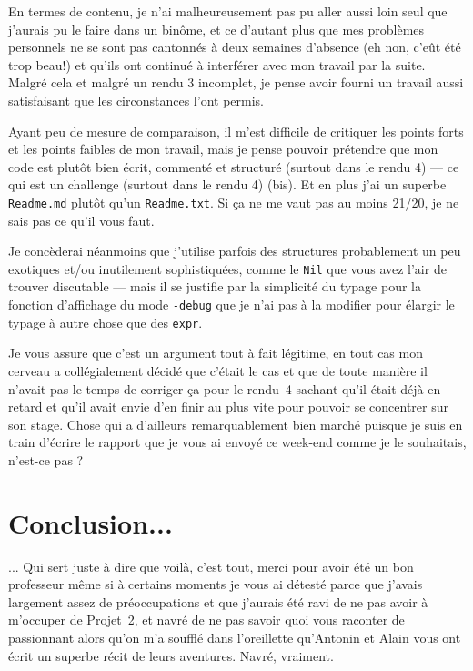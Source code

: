 \documentclass[12pt,a4paper]{report}
\begin{document}
En termes de contenu, je n'ai malheureusement pas pu aller aussi loin seul que j'aurais pu le faire dans un binôme, et ce d'autant plus que mes problèmes personnels ne se sont pas cantonnés à deux semaines d'absence (eh non, c'eût été trop beau!) et qu'ils ont continué à interférer avec mon travail par la suite. Malgré cela et malgré un rendu 3 incomplet, je pense avoir fourni un travail aussi satisfaisant que les circonstances l'ont permis.

Ayant peu de mesure de comparaison, il m'est difficile de critiquer les points forts et les points faibles de mon travail, mais je pense pouvoir prétendre que mon code est plutôt bien écrit, commenté et structuré (surtout dans le rendu 4) --- ce qui est un challenge (surtout dans le rendu 4) (bis). Et en plus j'ai un superbe \verb?Readme.md? plutôt qu'un \verb?Readme.txt?. Si ça ne me vaut pas au moins 21/20, je ne sais pas ce qu'il vous faut.

Je concèderai néanmoins que j'utilise parfois des structures probablement un peu exotiques et/ou inutilement sophistiquées, comme le \verb?Nil? que vous avez l'air de trouver discutable --- mais il se justifie par la simplicité du typage pour la fonction d'affichage du mode \verb?-debug? que je n'ai pas à la modifier pour élargir le typage à autre chose que des \verb?expr?.

Je vous assure que c'est un argument tout à fait légitime, en tout cas mon cerveau a collégialement décidé que c'était le cas et que de toute manière il n'avait pas le temps de corriger ça pour le rendu~4 sachant qu'il était déjà en retard et qu'il avait envie d'en finir au plus vite pour pouvoir se concentrer sur son stage. Chose qui a d'ailleurs remarquablement bien marché puisque je suis en train d'écrire le rapport que je vous ai envoyé ce week-end comme je le souhaitais, n'est-ce pas ?

\chapter*{Conclusion...}

... Qui sert juste à dire que voilà, c'est tout, merci pour avoir été un bon professeur même si à certains moments je vous ai détesté parce que j'avais largement assez de préoccupations et que j'aurais été ravi de ne pas avoir à m'occuper de Projet~2, et navré de ne pas savoir quoi vous raconter de passionnant alors qu'on m'a soufflé dans l'oreillette qu'Antonin et Alain vous ont écrit un superbe récit de leurs aventures. Navré, vraiment.
\end{document}
